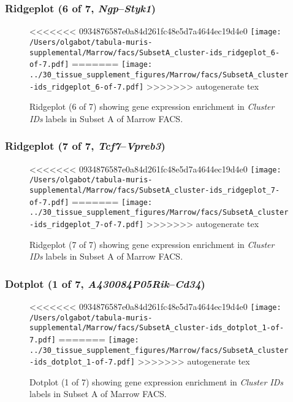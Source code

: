 \clearpage

\subsubsection{Ridgeplot (6 of 7, \emph{Ngp}--\emph{Styk1})}
\begin{figure}[h]
\centering
<<<<<<< 0934876587e0a84d261fc48e5d7a4644ec19d4e0
\texttt{[image: /Users/olgabot/tabula-muris-supplemental/Marrow/facs/SubsetA\_cluster-ids\_ridgeplot\_6-of-7.pdf]}
=======
\texttt{[image: ../30\_tissue\_supplement\_figures/Marrow/facs/SubsetA\_cluster-ids\_ridgeplot\_6-of-7.pdf]}
>>>>>>> autogenerate tex

\caption{ Ridgeplot (6 of 7)  showing gene expression enrichment in \emph{Cluster IDs} labels in Subset A of Marrow FACS. }
\end{figure}


\clearpage

\subsubsection{Ridgeplot (7 of 7, \emph{Tcf7}--\emph{Vpreb3})}
\begin{figure}[h]
\centering
<<<<<<< 0934876587e0a84d261fc48e5d7a4644ec19d4e0
\texttt{[image: /Users/olgabot/tabula-muris-supplemental/Marrow/facs/SubsetA\_cluster-ids\_ridgeplot\_7-of-7.pdf]}
=======
\texttt{[image: ../30\_tissue\_supplement\_figures/Marrow/facs/SubsetA\_cluster-ids\_ridgeplot\_7-of-7.pdf]}
>>>>>>> autogenerate tex

\caption{ Ridgeplot (7 of 7)  showing gene expression enrichment in \emph{Cluster IDs} labels in Subset A of Marrow FACS. }
\end{figure}


\clearpage

\subsubsection{Dotplot (1 of 7, \emph{A430084P05Rik}--\emph{Cd34})}
\begin{figure}[h]
\centering
<<<<<<< 0934876587e0a84d261fc48e5d7a4644ec19d4e0
\texttt{[image: /Users/olgabot/tabula-muris-supplemental/Marrow/facs/SubsetA\_cluster-ids\_dotplot\_1-of-7.pdf]}
=======
\texttt{[image: ../30\_tissue\_supplement\_figures/Marrow/facs/SubsetA\_cluster-ids\_dotplot\_1-of-7.pdf]}
>>>>>>> autogenerate tex

\caption{ Dotplot (1 of 7)  showing gene expression enrichment in \emph{Cluster IDs} labels in Subset A of Marrow FACS. }
\end{figure}


